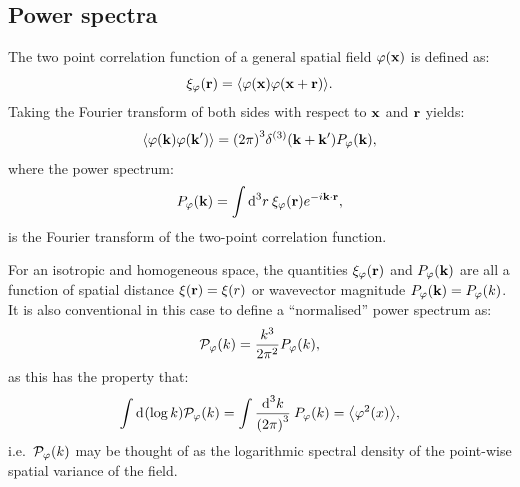 \subsection{Power spectra}
The two point correlation function of a general spatial field \(\varphi(\vx)\) is defined as:
\begin{equation}
  \xi_\varphi(\vr) = \mean{\varphi(\vx)\varphi(\vx + \vr)}.
\end{equation}
Taking the Fourier transform of both sides with respect to \(\vx\) and \(\vr\) yields:
\begin{equation}
  \mean{\varphi(\vk)\varphi(\vk^{\prime})} = {\left( 2\pi \right)}^3\delta^{(3)}(\vk + \vk^{\prime}) \Punnorm_\varphi(\vk),
  \label{eqn:cos:power_spectrum_definition}
\end{equation}
where the power spectrum:
\begin{equation}
  \Punnorm_{\varphi}(\vk) = \int \d[3]{r}\: \xi_\varphi(\vr)e^{-i\vk\cdot\vr},
  \label{eqn:cos:dimensionless_power_spectrum}
\end{equation}
is the Fourier transform of the two-point correlation function.

For an isotropic and homogeneous space, the quantities \(\xi_\varphi(\vr)\) and \(\Punnorm_\varphi(\vk)\) are all a function of spatial distance \({\xi(\vr) = \xi(r)}\) or wavevector magnitude \({\Punnorm_\varphi(\vk) = \Punnorm_\varphi(k)}\).
It is also conventional in this case to define a ``normalised'' power spectrum as:
\begin{equation}
  \Pnorm_\varphi(k) = \frac{k^3}{2\pi^2} \Punnorm_\varphi(k),
\end{equation}
as this has the property that:
\begin{equation}
    \int \d{(\log k)} \Pnorm_\varphi(k) = \int\frac{\d[3]{k}}{{\left( 2\pi \right)}^3}\: \Punnorm_\varphi(k) = \mean{\varphi^2(x)},
\end{equation}
i.e.\ \(\Pnorm_\varphi(k)\) may be thought of as the logarithmic spectral density of the point-wise spatial variance of the field.


